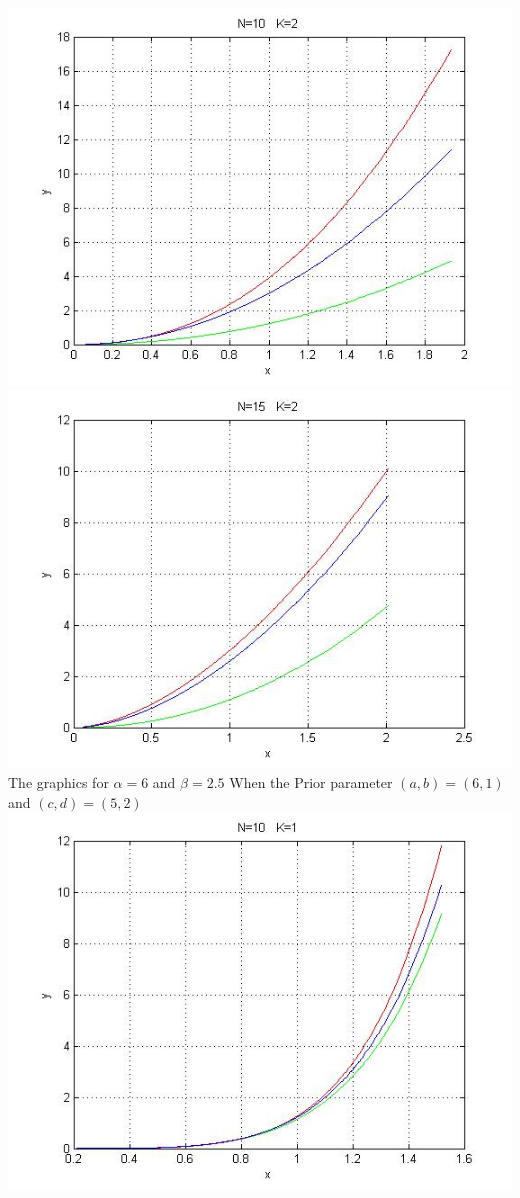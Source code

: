 \documentclass[a4paper, 11pt]{article}
\numberwithin{equation}{section}
\begin{document}
\includegraphics[width=1.0\textwidth]{../k2n10.jpg}\\
\includegraphics[width=1.0\textwidth]{../k2n15.jpg}\\
\newpage
The graphics for $\alpha=6$ and $\beta=2.5$ When the Prior parameter $(a, b )= (6, 1)$ and $(c, d) =(5, 2)$\\
\includegraphics[width=1.0\textwidth]{n10k1a6.jpg} 
\end{document}
